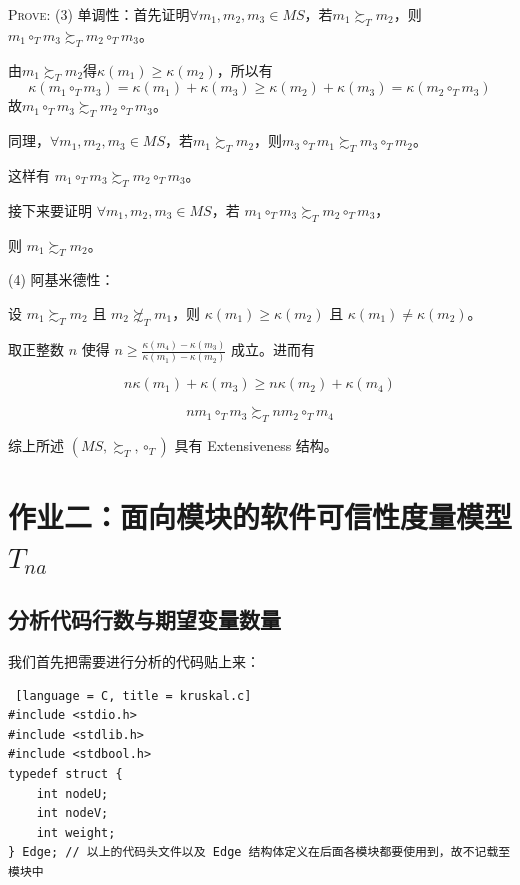 \documentclass[14pt,a4paper,UTF8,twoside]{article}
\renewenvironment{proof}[1][Prove:]{\ProofBox\strut\textsc{#1}\space}{\endProofBox}
\begin{document}
\begin{proof}
(3) 单调性：首先证明$\forall m_1, m_2, m_3 \in MS$，若$m_1 \succsim_T m_2$，则$m_1 \circ_T m_3 \succsim_T m_2 \circ_T m_3$。

由$m_1 \succsim_T m_2$得$\kappa(m_1) \geq \kappa(m_2)$，所以有
\begin{equation*}
    \kappa(m_1 \circ_T m_3) = \kappa(m_1) + \kappa(m_3) \geq \kappa(m_2) + \kappa(m_3) = \kappa(m_2 \circ_T m_3)
\end{equation*}
故$m_1 \circ_T m_3 \succsim_T m_2 \circ_T m_3$。

同理，$\forall m_1, m_2, m_3 \in MS$，若$m_1 \succsim_T m_2$，则$m_3 \circ_T m_1 \succsim_T m_3 \circ_T m_2$。

这样有 $m_1 \circ_T m_3 \succsim_T m_2 \circ_T m_3$。

接下来要证明 $\forall m_1, m_2, m_3 \in MS$，若 $m_1 \circ_T m_3 \succsim_T m_2 \circ_T m_3$，

则 $m_1 \succsim_T m_2$。

\vspace{0.5cm}

(4) 阿基米德性：

设 $m_1 \succsim_T m_2$ 且 $m_2 \not\succsim_T m_1$，则 $\kappa(m_1) \geq \kappa(m_2)$ 且 $\kappa(m_1) \neq \kappa(m_2)$。

取正整数 $n$ 使得 $n \geq \frac{\kappa(m_4) - \kappa(m_3)}{\kappa(m_1) - \kappa(m_2)}$ 成立。进而有

$$ n \kappa(m_1) + \kappa(m_3) \geq n \kappa(m_2) + \kappa(m_4) $$

$$ nm_1 \circ_T m_3 \succsim_T nm_2 \circ_T m_4 $$

综上所述 $(MS, \succsim_T, \circ_T)$ 具有 Extensiveness 结构。
\end{proof}


\section{作业二：面向模块的软件可信性度量模型 $T_{na} $ }

\subsection{分析代码行数与期望变量数量}
我们首先把需要进行分析的代码贴上来：

\begin{lstlisting} [language = C, title = kruskal.c]
#include <stdio.h>
#include <stdlib.h>
#include <stdbool.h>
typedef struct {
    int nodeU;
    int nodeV;
    int weight;
} Edge; // 以上的代码头文件以及 Edge 结构体定义在后面各模块都要使用到，故不记载至模块中
\end{lstlisting}
\end{document}
